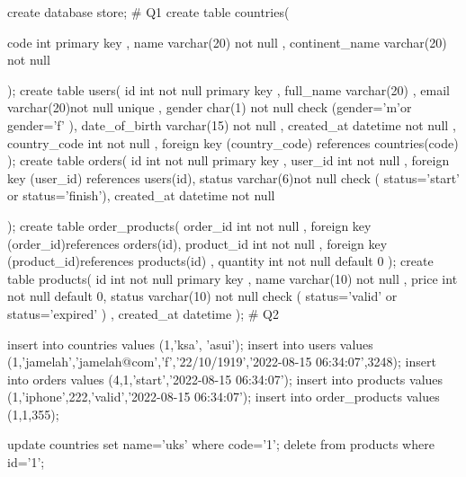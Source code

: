 create database store;
# Q1
create table countries(

    code int primary key ,
    name varchar(20) not null ,
    continent_name varchar(20) not null

);
  create table users(
     id int not null primary key ,
     full_name varchar(20) ,
     email varchar(20)not null unique ,
     gender char(1) not null  check (gender='m'or gender='f' ),
     date_of_birth varchar(15) not null ,
     created_at datetime not null ,
     country_code int not null ,
  foreign key (country_code) references countries(code)
  );
create table orders(
    id int not null primary key ,
    user_id int not null ,
    foreign key (user_id) references users(id),
    status varchar(6)not null check ( status='start' or status='finish'),
    created_at datetime not null

);
create table order_products(
    order_id int not null ,
    foreign key (order_id)references orders(id),
    product_id int not null ,
    foreign key (product_id)references products(id) ,
    quantity int not null default 0
);
create table products(
    id int not null primary key ,
   name varchar(10) not null ,
   price int not null default 0,
   status varchar(10) not null check ( status='valid' or status='expired' ) ,
   created_at datetime
);
# Q2

insert into countries values (1,'ksa', 'asui');
 insert into  users values (1,'jamelah','jamelah@com','f','22/10/1919','2022-08-15 06:34:07',3248);
 insert into  orders values (4,1,'start','2022-08-15 06:34:07');
insert into products values (1,'iphone',222,'valid','2022-08-15 06:34:07');
 insert into order_products values (1,1,355);

update countries set name='uks' where code='1';
delete from products  where id='1';